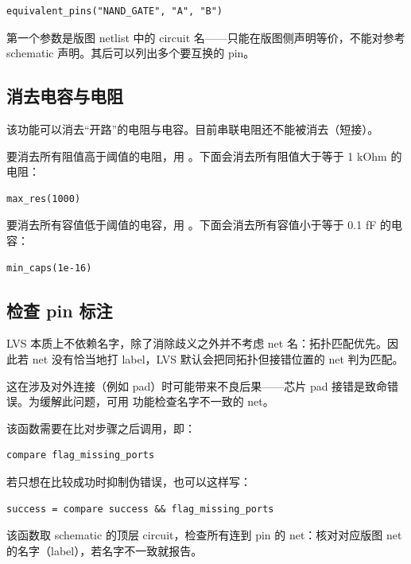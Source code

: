 \begin{lstlisting}
equivalent_pins("NAND_GATE", "A", "B")
\end{lstlisting}

第一个参数是版图 netlist 中的 circuit 名——只能在版图侧声明等价，不能对参考 schematic 声明。其后可以列出多个要互换的 pin。

\subsection{消去电容与电阻}

该功能可以消去“开路”的电阻与电容。目前串联电阻还不能被消去（短接）。

要消去所有阻值高于阈值的电阻，用 。下面会消去所有阻值大于等于 1 kOhm 的电阻：

\begin{lstlisting}
max_res(1000)
\end{lstlisting}

要消去所有容值低于阈值的电容，用 。下面会消去所有容值小于等于 0.1 fF 的电容：

\begin{lstlisting}
min_caps(1e-16)
\end{lstlisting}

\subsection{检查 pin 标注}

LVS 本质上不依赖名字，除了消除歧义之外并不考虑 net 名：拓扑匹配优先。因此若 net 没有恰当地打 label，LVS 默认会把同拓扑但接错位置的 net 判为匹配。

这在涉及对外连接（例如 pad）时可能带来不良后果——芯片 pad 接错是致命错误。为缓解此问题，可用  功能检查名字不一致的 net。

该函数需要在比对步骤之后调用，即：

\begin{lstlisting}
compare flag_missing_ports
\end{lstlisting}

若只想在比较成功时抑制伪错误，也可以这样写：

\begin{lstlisting}
success = compare success && flag_missing_ports
\end{lstlisting}

该函数取 schematic 的顶层 circuit，检查所有连到 pin 的 net：核对对应版图 net 的名字（label），若名字不一致就报告。

